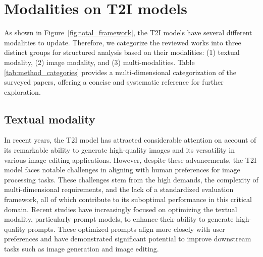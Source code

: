 \section{Modalities on T2I models}
\label{sec:modalities_on_t2i_models}

As shown in Figure~\ref{fig:total_framework}, the T2I models have several different modalities to update. Therefore, we categorize the reviewed works into three distinct groups for structured analysis based on their modalities: (1) textual modality, (2) image modality, and (3) multi-modalities. Table \ref{tab:method_categories} provides a multi-dimensional categorization of the surveyed papers, offering a concise and systematic reference for further exploration.


\subsection{Textual modality}

In recent years, the T2I model has attracted considerable attention on account of its remarkable ability to generate high-quality images and its versatility in various image editing applications. However, despite these advancements, the T2I model faces notable challenges in aligning with human preferences for image processing tasks. These challenges stem from the high demands, the complexity of multi-dimensional requirements, and the lack of a standardized evaluation framework, all of which contribute to its suboptimal performance in this critical domain. Recent studies have increasingly focused on optimizing the textual modality, particularly prompt models, to enhance their ability to generate high-quality prompts. These optimized prompts align more closely with user preferences and have demonstrated significant potential to improve downstream tasks such as image generation and image editing.

